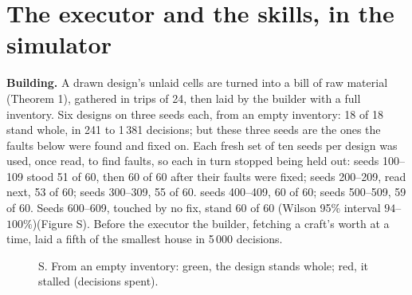 \section*{The executor and the skills, in the simulator}
\textbf{Building.} A drawn design's unlaid cells are turned into a bill of raw material (Theorem 1), gathered in trips
of 24, then laid by the builder with a full inventory. Six designs on three seeds each, from an empty inventory: 18 of 18 stand whole, in 241 to 1\,381 decisions; but
these three seeds are the ones the faults below were found and fixed on. Each fresh set of ten seeds per design was
used, once read, to find faults, so each in turn stopped being held out: seeds 100--109 stood 51 of 60, then 60 of 60
after their faults were fixed; seeds 200--209, read next, 53 of 60; seeds 300--309, 55 of 60. seeds 400--409, 60 of 60;
seeds 500--509, 59 of 60. Seeds 600--609, touched by no fix, stand 60 of 60 (Wilson 95\% interval $94$--$100\%$)(Figure S). Before the executor the builder,
fetching a craft's worth at a time, laid a fifth of the smallest house in 5\,000 decisions.

\begin{figure}[h]\centering
{}
\caption{S. From an empty inventory: green, the design stands whole; red, it stalled (decisions spent).}
\end{figure}

